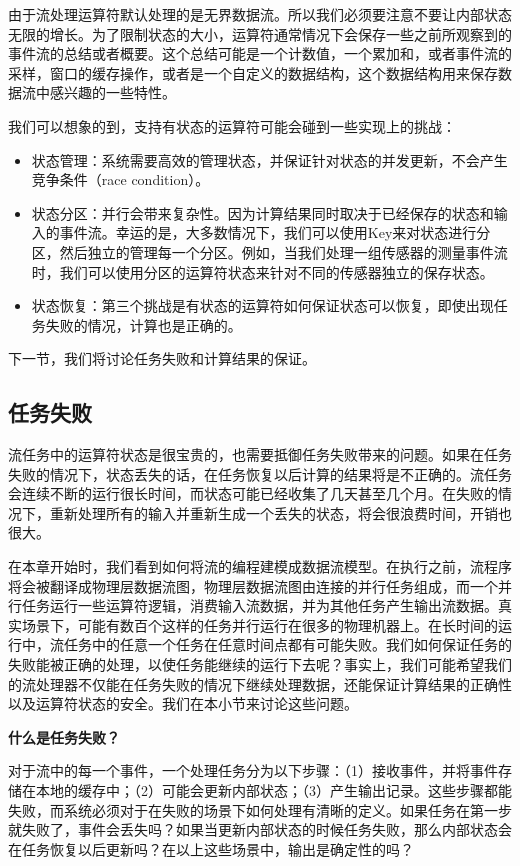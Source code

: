 \documentclass[cn,11pt,chinese]{elegantbook}
\begin{document}
由于流处理运算符默认处理的是无界数据流。所以我们必须要注意不要让内部状态无限的增长。为了限制状态的大小，运算符通常情况下会保存一些之前所观察到的事件流的总结或者概要。这个总结可能是一个计数值，一个累加和，或者事件流的采样，窗口的缓存操作，或者是一个自定义的数据结构，这个数据结构用来保存数据流中感兴趣的一些特性。

我们可以想象的到，支持有状态的运算符可能会碰到一些实现上的挑战：

\begin{itemize}
    \item 状态管理：系统需要高效的管理状态，并保证针对状态的并发更新，不会产生竞争条件（race condition）。
    \item 状态分区：并行会带来复杂性。因为计算结果同时取决于已经保存的状态和输入的事件流。幸运的是，大多数情况下，我们可以使用Key来对状态进行分区，然后独立的管理每一个分区。例如，当我们处理一组传感器的测量事件流时，我们可以使用分区的运算符状态来针对不同的传感器独立的保存状态。
    \item 状态恢复：第三个挑战是有状态的运算符如何保证状态可以恢复，即使出现任务失败的情况，计算也是正确的。
\end{itemize}

下一节，我们将讨论任务失败和计算结果的保证。

\subsection{任务失败}

流任务中的运算符状态是很宝贵的，也需要抵御任务失败带来的问题。如果在任务失败的情况下，状态丢失的话，在任务恢复以后计算的结果将是不正确的。流任务会连续不断的运行很长时间，而状态可能已经收集了几天甚至几个月。在失败的情况下，重新处理所有的输入并重新生成一个丢失的状态，将会很浪费时间，开销也很大。

在本章开始时，我们看到如何将流的编程建模成数据流模型。在执行之前，流程序将会被翻译成物理层数据流图，物理层数据流图由连接的并行任务组成，而一个并行任务运行一些运算符逻辑，消费输入流数据，并为其他任务产生输出流数据。真实场景下，可能有数百个这样的任务并行运行在很多的物理机器上。在长时间的运行中，流任务中的任意一个任务在任意时间点都有可能失败。我们如何保证任务的失败能被正确的处理，以使任务能继续的运行下去呢？事实上，我们可能希望我们的流处理器不仅能在任务失败的情况下继续处理数据，还能保证计算结果的正确性以及运算符状态的安全。我们在本小节来讨论这些问题。

\textbf{什么是任务失败？}

对于流中的每一个事件，一个处理任务分为以下步骤：（1）接收事件，并将事件存储在本地的缓存中；（2）可能会更新内部状态；（3）产生输出记录。这些步骤都能失败，而系统必须对于在失败的场景下如何处理有清晰的定义。如果任务在第一步就失败了，事件会丢失吗？如果当更新内部状态的时候任务失败，那么内部状态会在任务恢复以后更新吗？在以上这些场景中，输出是确定性的吗？
\end{document}
